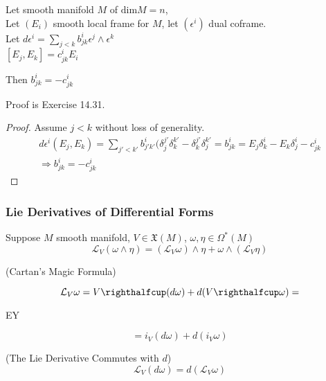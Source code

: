 \begin{proposition}[14.30]
  Let smooth manifold $M$ of $\text{dim}M = n$, \\
  Let $(E_i)$ smooth local frame for $M$, let $(\epsilon^i)$ dual coframe. \\
  Let $d\epsilon^i = \sum_{j<k} b^i_{jk} \epsilon^j \wedge \epsilon^k $ \\
  \phantom{Let }$[E_j,E_k] = c^i_{jk} E_i$

Then $b^i_{jk} = -c^i_{jk}$
\end{proposition}

Proof is Exercise 14.31.  


\begin{proof}
  Assume $j <k$ without loss of generality.  
  \[
\begin{gathered}
  d\epsilon^i(E_j,E_k) = \sum_{j' < k'} b^i_{j'k'}(\delta^{j'}_j \delta^{k'}_k - \delta^{j'}_k \delta^{k'}_j = b^i_{jk} = E_j \delta^i_k - E_k \delta^i_j - c^i_{jk} \\
  \Longrightarrow b^i_{jk} = -c^i_{jk}
\end{gathered}
\]
\end{proof}

\subsubsection*{Lie Derivatives of Differential Forms}


\begin{proposition}[14.33]
  Suppose $M$ smooth manifold, $V \in \mathfrak{X}(M)$, $\omega, \eta \in \Omega^*(M)$ 
\[
\mathcal{L}_V(\omega \wedge \eta) = (\mathcal{L}_V \omega) \wedge \eta + \omega \wedge (\mathcal{L}_V \eta)
\]
\end{proposition}

\begin{theorem}[14.35] (Cartan's Magic Formula) 

\[
\mathcal{L}_V \omega = V \righthalfcup (d\omega) + d(V\righthalfcup \omega) = 
\]

EY

\[
= i_V(d\omega) + d(i_V\omega)
\]
\end{theorem}

\begin{corollary}[14.36] (The Lie Derivative Commutes with $d$)
\[
\mathcal{L}_V(d\omega) = d(\mathcal{L}_V\omega)
\]
\end{corollary}

